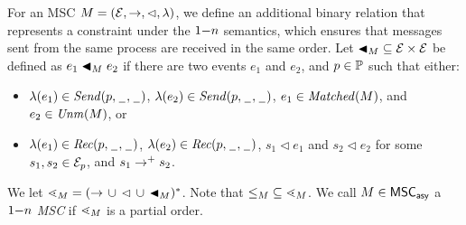 
\begin{definition} %
For an MSC $\msc = (\Events,\procrel,\lhd,\lambda)$, we define
an additional binary relation that represents a constraint
under the $\onen$ semantics, which ensures that messages sent from the same process are received in the same order. Let ${\onenrel}_\msc \subseteq \Events \times \Events$ be defined as $e_1 \onenrel_\msc e_2$ if there are two events $e_1$ and $e_2$, and $p \in \Procs$ such that either:
\begin{itemize}\itemsep=0.5ex
	\item $\lambda(e_1) \in \psAct{p}$, $\lambda(e_2) \in \psAct{p}$, $e_1 \in \Matched{\msc}$, and $e_2 \in \Unm{\msc}$, or
	\item $\lambda(e_1) \in \prAct{p}$, $\lambda(e_2) \in \prAct{p}$, $s_1 \lhd e_1$ and $s_2 \lhd e_2$ for some $s_1,s_2 \in \Events_p$, and $s_1 \procrel^+ s_2$.
\end{itemize}

We let ${\lessdot_\msc} = ({\procrel} \,\cup\, {\lhd} \,\cup\, {\onenrel_\msc})^\ast$.
Note that ${\le_\msc} \subseteq {\lessdot_\msc}$.
%
	We call $\msc \in \asMSCs$ a \emph{$\onen$ MSC}
	if ${\lessdot_\msc}$ is a partial order.
\end{definition}



